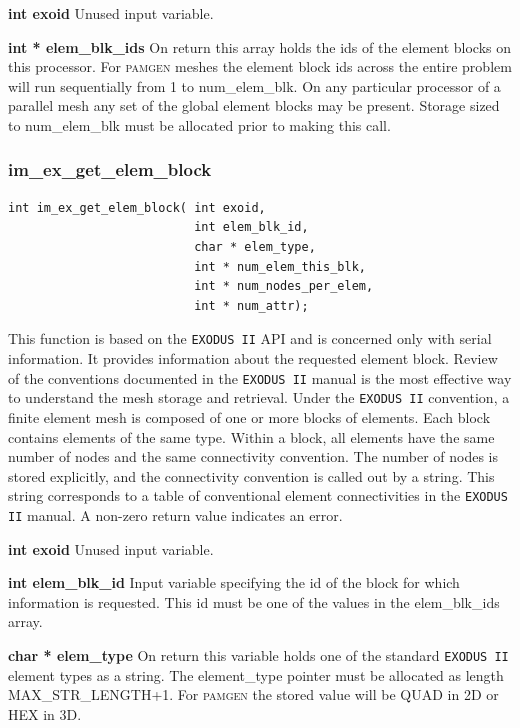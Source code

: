 {\setlength{\parindent}{0pt}
 \textbf{int exoid} Unused input variable.}

{\setlength{\parindent}{0pt}
 \textbf{int * elem\_blk\_ids}  On return this array holds the ids of the element blocks on this processor. For \textsc{pamgen} meshes the element block ids across the entire problem will run sequentially from 1 to num\_elem\_blk. On any particular processor of a parallel mesh any set of the global element blocks may be present. Storage sized to num\_elem\_blk must be allocated prior to making this call.}

\subsubsection{im\_ex\_get\_elem\_block}
{\ttfamily  \begin{verbatim}
int im_ex_get_elem_block( int exoid,
                          int elem_blk_id,
                          char * elem_type,
                          int * num_elem_this_blk,
                          int * num_nodes_per_elem,
                          int * num_attr);
\end{verbatim}}
This function is based on the \texttt{EXODUS II} API and is concerned only with serial information. It provides information about the requested element block.  Review of the conventions documented in the \texttt{EXODUS II} manual is the most effective way to understand the mesh storage and retrieval. Under the \texttt{EXODUS II} convention, a finite element mesh is composed of one or more blocks of elements. Each block contains elements of the same type. Within a block, all elements have the same number of nodes and the same connectivity convention. The number of nodes is stored explicitly, and the connectivity convention is called out by a string. This string corresponds to a table of conventional element connectivities in the \texttt{EXODUS II} manual. A non-zero return value indicates an error.

{\setlength{\parindent}{0pt}
 \textbf{int exoid} Unused input variable.}

{\setlength{\parindent}{0pt}
 \textbf{int elem\_blk\_id}  Input variable specifying the id of the block for which information is requested. This id must be one of the values in the elem\_blk\_ids array.}

{\setlength{\parindent}{0pt}
 \textbf{char * elem\_type}  On return this variable holds one of the standard \texttt{EXODUS II} element types as a string. The element\_type pointer must be allocated as length MAX\_STR\_LENGTH+1. For \textsc{pamgen} the stored value will be QUAD in 2D or HEX in 3D.}

